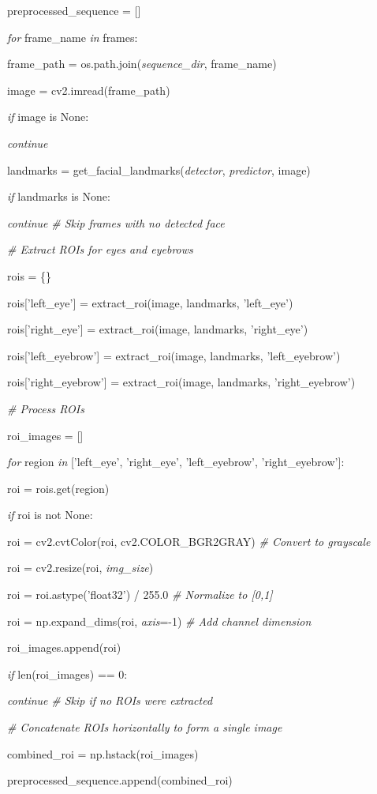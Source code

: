 \documentclass[
]{article}
\begin{document}
preprocessed\_sequence = {[}{]}

\emph{for} frame\_name \emph{in} frames:

frame\_path = os.path.join(\emph{sequence\_dir}, frame\_name)

image = cv2.imread(frame\_path)

\emph{if} image is None:

\emph{continue}

landmarks = get\_facial\_landmarks(\emph{detector}, \emph{predictor}, image)

\emph{if} landmarks is None:

\emph{continue} \emph{\# Skip frames with no detected face}

\emph{\# Extract ROIs for eyes and eyebrows}

rois = \{\}

rois{[}'left\_eye'{]} = extract\_roi(image, landmarks, 'left\_eye')

rois{[}'right\_eye'{]} = extract\_roi(image, landmarks, 'right\_eye')

rois{[}'left\_eyebrow'{]} = extract\_roi(image, landmarks, 'left\_eyebrow')

rois{[}'right\_eyebrow'{]} = extract\_roi(image, landmarks, 'right\_eyebrow')

\emph{\# Process ROIs}

roi\_images = {[}{]}

\emph{for} region \emph{in} {[}'left\_eye', 'right\_eye', 'left\_eyebrow', 'right\_eyebrow'{]}:

roi = rois.get(region)

\emph{if} roi is not None:

roi = cv2.cvtColor(roi, cv2.COLOR\_BGR2GRAY) \emph{\# Convert to grayscale}

roi = cv2.resize(roi, \emph{img\_size})

roi = roi.astype('float32') / 255.0 \emph{\# Normalize to {[}0,1{]}}

roi = np.expand\_dims(roi, \emph{axis}=-1) \emph{\# Add channel dimension}

roi\_images.append(roi)

\emph{if} len(roi\_images) == 0:

\emph{continue} \emph{\# Skip if no ROIs were extracted}

\emph{\# Concatenate ROIs horizontally to form a single image}

combined\_roi = np.hstack(roi\_images)

preprocessed\_sequence.append(combined\_roi)
\end{document}
